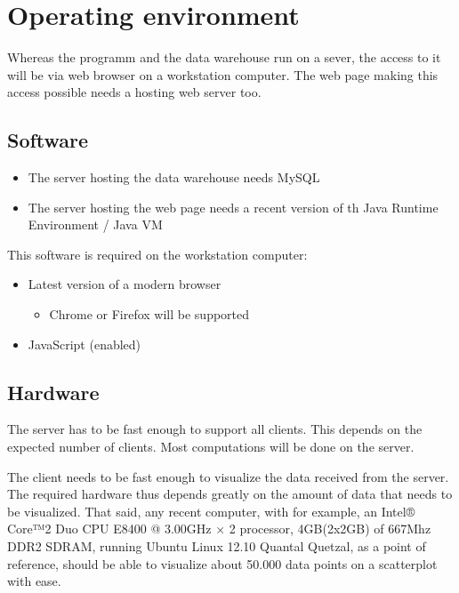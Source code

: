 \section{Operating environment}


Whereas the programm and the data warehouse run on a sever, 
the access to it will be via web browser on a workstation computer. 
The web page making this access possible needs a hosting web server too.


\subsection{Software}
\begin{itemize}
  \item The server hosting the data warehouse needs  MySQL %
  
  \item The server hosting the web page needs a 
  recent version of th Java Runtime Environment / Java VM  %
\end{itemize}


This software is required on the workstation computer:
\begin{itemize}
  \item Latest version of a modern browser
  \begin{itemize}
    \item Chrome or Firefox will be supported
  \end{itemize}
  \item JavaScript (enabled)
\end{itemize}


\subsection{Hardware}

The server has to be fast enough to support all clients. This depends on
the expected number of clients. Most computations will be done on the server.

The client needs to be fast enough to visualize the data received from the server. 
The required hardware thus depends greatly on the amount of data that needs to be 
visualized. That said, any recent computer, with for example, 
an Intel® Core™2 Duo CPU E8400 @ 3.00GHz × 2 processor, 
4GB(2x2GB) of 667Mhz DDR2 SDRAM, running Ubuntu Linux 12.10 Quantal Quetzal, 
as a point of reference, should be able to visualize about 50.000 
data points on a scatterplot with ease.


